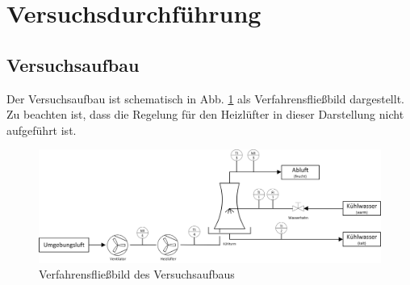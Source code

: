 \newpage
\section{Versuchsdurchführung}

\subsection*{Versuchsaufbau}
Der Versuchsaufbau ist schematisch in Abb. \ref{fig:fliessbild} als Verfahrensfließbild dargestellt. Zu beachten ist, dass die Regelung für den Heizlüfter  in dieser Darstellung nicht aufgeführt ist.

\begin{figure}[h!]
	\centering
	\includegraphics[width=\textwidth]{img/fliessbild}
	\caption{Verfahrensfließbild des Versuchsaufbaus}
	\label{fig:fliessbild}
\end{figure}
\FloatBarrier
